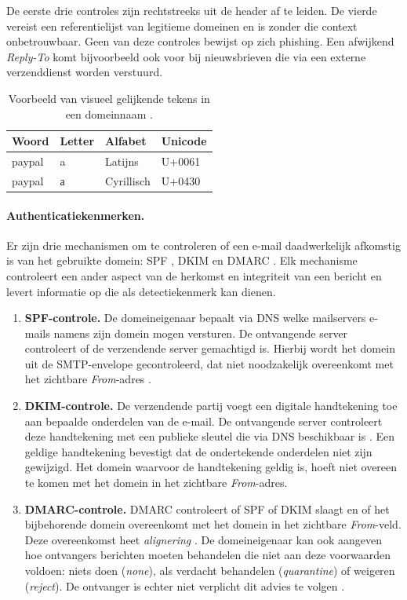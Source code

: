 De eerste drie controles zijn rechtstreeks uit de header af te leiden. De vierde vereist een referentielijst van legitieme domeinen en is zonder die context onbetrouwbaar. Geen van deze controles bewijst op zich phishing. Een afwijkend \emph{Reply-To} komt bijvoorbeeld ook voor bij nieuwsbrieven die via een externe verzenddienst worden verstuurd.

\begin{table}[htbp]
  \centering
  \begin{tabular}{llll}
    \toprule
    \textbf{Woord} & \textbf{Letter} & \textbf{Alfabet} & \textbf{Unicode} \\
    \midrule
    paypal & a & Latijns    & U+0061 \\
    paypal & а & Cyrillisch & U+0430 \\
    \bottomrule
  \end{tabular}
  \caption{Voorbeeld van visueel gelijkende tekens in een domeinnaam \autocite{Davis2026}.}
  \label{tab:homograaf}
\end{table}


\paragraph{Authenticatiekenmerken.}
\label{subsubsec:Afzender en e-mailheaders:authenticatiekenmerken}
Er zijn drie mechanismen om te controleren of een e-mail daadwerkelijk afkomstig is van het gebruikte domein: SPF \autocite{Kitterman2014}, DKIM \autocite{Crocker2011} en DMARC \autocite{Herr2026}. Elk mechanisme controleert een ander aspect van de herkomst en integriteit van een bericht en levert informatie op die als detectiekenmerk kan dienen.

\begin{enumerate}
    \item \textbf{SPF-controle.} De domeineigenaar bepaalt via DNS welke mailservers e-mails namens zijn domein mogen versturen. De ontvangende server controleert of de verzendende server gemachtigd is. Hierbij wordt het domein uit de SMTP-envelope gecontroleerd, dat niet noodzakelijk overeenkomt met het zichtbare \emph{From}-adres \autocite{Kitterman2014}.
    \item \textbf{DKIM-controle.} De verzendende partij voegt een digitale handtekening toe aan bepaalde onderdelen van de e-mail. De ontvangende server controleert deze handtekening met een publieke sleutel die via DNS beschikbaar is \autocite{Crocker2011}. Een geldige handtekening bevestigt dat de ondertekende onderdelen niet zijn gewijzigd. Het domein waarvoor de handtekening geldig is, hoeft niet overeen te komen met het domein in het zichtbare \emph{From}-adres.
    \item \textbf{DMARC-controle.} DMARC controleert of SPF of DKIM slaagt en of het bijbehorende domein overeenkomt met het domein in het zichtbare \emph{From}-veld. Deze overeenkomst heet \emph{alignering} \autocite{Herr2026}. De domeineigenaar kan ook aangeven hoe ontvangers berichten moeten behandelen die niet aan deze voorwaarden voldoen: niets doen (\emph{none}), als verdacht behandelen (\emph{quarantine}) of weigeren (\emph{reject}). De ontvanger is echter niet verplicht dit advies te volgen \autocite{Herr2026}.
\end{enumerate}


